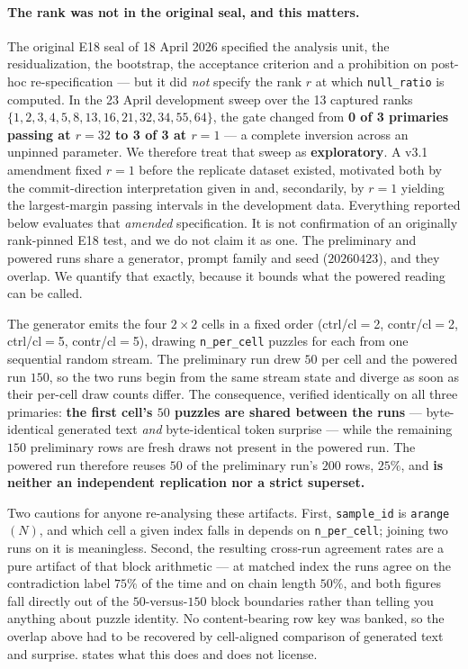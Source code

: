 \documentclass[10pt, letterpaper]{article}
\begin{document}
\paragraph{The rank was not in the original seal, and this matters.}
The original E18 seal of 18 April 2026 specified the analysis unit,
the residualization, the bootstrap, the acceptance criterion and a
prohibition on post-hoc re-specification --- but it did \emph{not}
specify the rank $r$ at which \texttt{null\_ratio} is computed. In the
23 April development sweep over the 13 captured ranks
$\{1,2,3,4,5,8,13,16,21,32,34,55,64\}$, the gate changed from
\textbf{0 of 3 primaries passing at $r{=}32$ to 3 of 3 at $r{=}1$} --- a
complete inversion across an unpinned parameter. We therefore treat
that sweep as \textbf{exploratory}. A v3.1 amendment fixed $r{=}1$
before the replicate dataset existed, motivated both by the
commit-direction interpretation given in 
and, secondarily, by $r{=}1$ yielding the largest-margin passing
intervals in the development data. Everything reported below evaluates
that \emph{amended} specification. It is not confirmation of an
originally rank-pinned E18 test, and we do not claim it as one.
The preliminary and powered runs share a generator, prompt family and
seed ($20260423$), and they overlap. We quantify that exactly, because
it bounds what the powered reading can be called.

The generator emits the four $2\times2$ cells in a fixed order
(ctrl/cl$=$2, contr/cl$=$2, ctrl/cl$=$5, contr/cl$=$5), drawing
\texttt{n\_per\_cell} puzzles for each from one sequential random
stream. The preliminary run drew $50$ per cell and the powered run
$150$, so the two runs begin from the same stream state and diverge as
soon as their per-cell draw counts differ. The consequence, verified
identically on all three primaries: \textbf{the first cell's $50$
puzzles are shared between the runs} --- byte-identical generated text
\emph{and} byte-identical token surprise --- while the remaining $150$
preliminary rows are fresh draws not present in the powered run. The
powered run therefore reuses $50$ of the preliminary run's $200$ rows,
$25\%$, and \textbf{is neither an independent replication nor a strict
superset.}

Two cautions for anyone re-analysing these artifacts. First,
\texttt{sample\_id} is \texttt{arange}$(N)$, and which cell a given
index falls in depends on \texttt{n\_per\_cell}; joining two runs on it
is meaningless. Second, the resulting cross-run agreement rates are a
pure artifact of that block arithmetic --- at matched index the runs
agree on the contradiction label $75\%$ of the time and on chain length
$50\%$, and both figures fall directly out of the $50$-versus-$150$
block boundaries rather than telling you anything about puzzle
identity. No content-bearing row key was banked, so the overlap above
had to be recovered by cell-aligned comparison of generated text and
surprise.  states what this does and does
not license.
\end{document}
